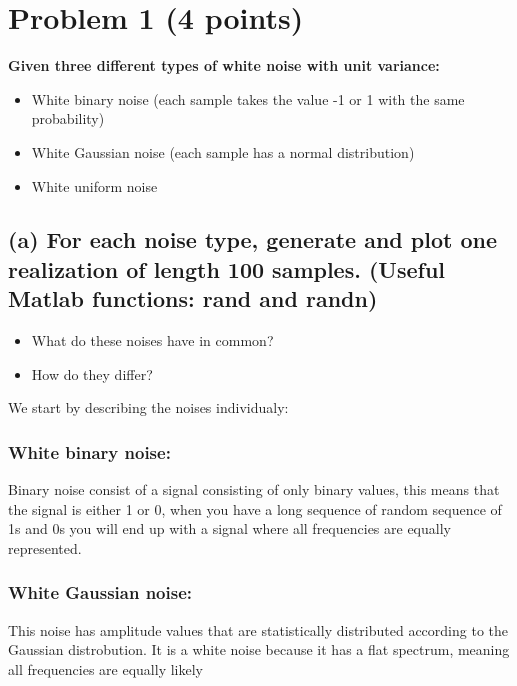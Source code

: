 \section{Problem 1 (4 points)}

\textbf{Given three different types of white noise with unit variance:}
\begin{itemize}
    \item White binary noise (each sample takes the value -1 or 1 with the same probability)
    \item White Gaussian noise (each sample has a normal distribution)
    \item White uniform noise
\end{itemize}

\subsection*{(a) For each noise type, generate and plot one realization of length 100 samples. (Useful Matlab functions: rand and randn)}
\begin{itemize}
    \item What do these noises have in common?
    \item How do they differ?
\end{itemize}

We start by describing the noises individualy:

\subsubsection*{White binary noise:}
Binary noise consist of a signal consisting of only binary values, this means that the signal is either 1 or 0, when you have a long sequence of random sequence of 1s and 0s you will end up with a signal where all frequencies are equally represented.

\subsubsection*{White Gaussian noise:}
This noise has amplitude values that are statistically distributed according to the Gaussian distrobution. It is a white noise because it has a flat spectrum, meaning all frequencies are equally likely

